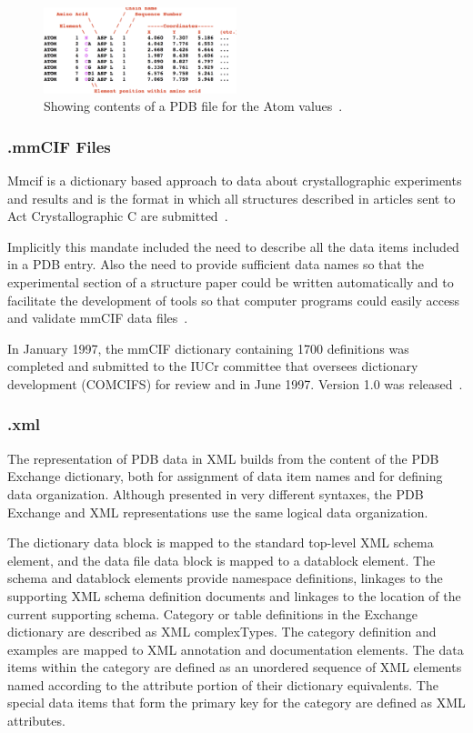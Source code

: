 \documentclass{report}
\begin{document}
\begin{figure}[H]
    \centering
    \includegraphics[width=0.5\textwidth]{PDB File.png}
    \caption{\label{fig:PDB file}Showing contents of a PDB file for the Atom values~\cite{adams_announcing_2019}.}
\end{figure}

\subsubsection{.mmCIF Files}
Mmcif is a dictionary based approach to data about crystallographic experiments and results and is the format in which all structures described in articles sent to Act Crystallographic C
are submitted~\cite{westbrook_pdb_2003}.

Implicitly this mandate included the need to describe all the data items included in a PDB entry. Also the need to provide sufficient data names so that the experimental section of a structure paper could be written automatically and to facilitate the development of tools so that computer programs could easily access and validate mmCIF data files~\cite{westbrook_pdb_2003}.

In January 1997, the mmCIF dictionary containing 1700 definitions was completed and submitted to the IUCr committee that oversees dictionary development (COMCIFS) for review and in June 1997. Version 1.0 was released~\cite{westbrook_pdb_2003}.

\subsubsection{.xml}

The representation of PDB data in XML builds from the content of the PDB Exchange dictionary, both for assignment of data item names and for defining data organization. Although presented in very different syntaxes, the PDB Exchange and XML representations use the same logical data organization.

The dictionary data block is mapped to the standard top-level XML schema element, and the data file data block is mapped to a datablock element. The schema and datablock elements provide namespace definitions, linkages to the supporting XML schema definition documents and linkages to the location of the current supporting schema.
Category or table definitions in the Exchange dictionary are
described as XML complexTypes. The category definition and
examples are mapped to XML annotation and documentation elements. The data items within the category are defined as an unordered sequence of XML elements named according to the attribute portion of their dictionary equivalents. The special data items that form the primary key for the category are defined as XML attributes.
\end{document}
